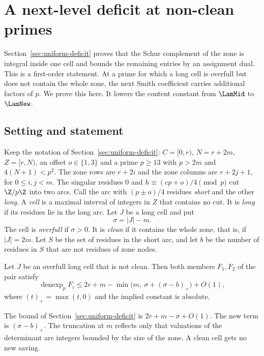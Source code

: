 \section{A next-level deficit at non-clean primes}\label{sec:next-level}

Section~\ref{sec:uniform-deficit} proves that the Schur complement of the zone is integral inside one cell and
bounds the remaining entries by an assignment dual. This is a first-order statement. At a prime for which a long cell is
overfull but does not contain the whole zone, the next Smith coefficient carries additional factors of $p$. We
prove this here. It lowers the content constant from $\LamMid$ to $\LamNew$.

\subsection{Setting and statement}
Keep the notation of Section~\ref{sec:uniform-deficit}: $C=[0,r)$, $N=r+2m$, $Z=[r,N)$, an offset $o\in\{1,3\}$ and a prime $p\ge13$
with $p>2m$ and $4(N+1)<p^2$. The zone rows are $r+2i$ and the zone columns are $r+2j+1$, for $0\le i,j<m$.
The singular residues $0$ and $h\equiv(cp+o)/4\pmod p$ cut $\Z/p\Z$ into two arcs. Call the arc with $(p\pm o)/4$ residues \emph{short} and the other \emph{long}.
A \emph{cell} is a maximal interval of integers in $Z$ that contains no cut. It is \emph{long} if its residues lie in the long arc. Let $J$ be a long cell and put
\[
 \sigma=|J|-m .
\]
The cell is \emph{overfull} if $\sigma>0$. It is \emph{clean} if it contains the whole zone, that is, if $|J|=2m$.
Let $S$ be the set of residues in the short arc, and let $b$ be the number of residues in $S$ that are not residues of zone nodes.

\begin{theorem}\label{thm:nextlevel}
Let $J$ be an overfull long cell that is not clean. Then both members $F_1,F_2$ of the pair satisfy
\[
 \operatorname{denexp}_pF_i\le 2r+m-\min\bigl(m,\ \sigma+(\sigma-b)_+\bigr)+O(1),
\]
where $(t)_+=\max(t,0)$ and the implied constant is absolute.
\end{theorem}

The bound of Section~\ref{sec:uniform-deficit} is $2r+m-\sigma+O(1)$. The new term is $(\sigma-b)_+$. The truncation at $m$ reflects only that valuations
of the determinant are integers bounded by the size of the zone. A clean cell gets no new saving.

